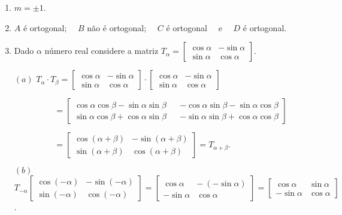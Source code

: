 \documentclass{report}
\begin{document}
\begin{enumerate}

\item $m = \pm 1$.


\item $A$ é ortogonal; \ \ $B$ não é ortogonal; \ \ $C$ é
ortogonal \ \ e \ \ $D$ é ortogonal.



\item \label{1lista17} Dado $\alpha$ número real considere a
matriz $T_\alpha=\left[
\begin{array}{rr}
\cos \alpha & -\sin \alpha \\
\sin \alpha & \cos \alpha
\end{array}
\right]$.

$(a)$ $T_\alpha \cdot T_\beta=\left[
\begin{array}{rr}
\cos \alpha & -\sin \alpha \\
\sin \alpha & \cos \alpha
\end{array}
\right] \cdot \left[
\begin{array}{rr}
\cos \alpha & -\sin \alpha \\
\sin \alpha & \cos \alpha
\end{array}
\right] $

$\hspace{2cm}= \left[
\begin{array}{rrr}
\cos \alpha \cos \beta - \sin\alpha \sin \beta & &
-\cos \alpha \sin \beta -\sin \alpha \cos \beta \\
\sin \alpha  \cos \beta +\cos \alpha \sin \beta &  & - \sin \alpha
\sin \beta + \cos \alpha \cos \beta
\end{array}
\right] $

$\hspace{2cm}= \left[
\begin{array}{rr}
\cos (\alpha+\beta) & -\sin (\alpha+\beta) \\
\sin (\alpha+\beta) & \cos (\alpha+\beta)
\end{array}
\right] = T_{\alpha +\beta}$.

$(b)$ $T_{-\alpha}\left[
\begin{array}{rr}
\cos (-\alpha) & - \sin (-\alpha) \\
\sin (-\alpha) & \cos (-\alpha)
\end{array}
\right] = \left[
\begin{array}{rr}
\cos \alpha & - \ (-\sin \alpha) \\
-\sin \alpha & \cos \alpha
\end{array}
\right]=\left[
\begin{array}{rr}
\cos \alpha & \sin \alpha \\
-\sin \alpha & \cos \alpha
\end{array}
\right]$.


\end{enumerate}
\end{document}
